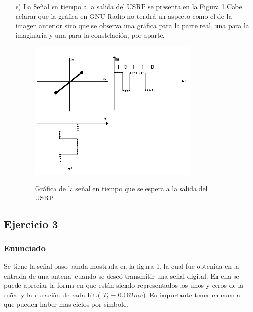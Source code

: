 \begin{itemize}
\item[e)] La Señal en tiempo a la salida del USRP se presenta en la Figura \ref{fig:senalesperadausrp}.Cabe aclarar que la gráfica en GNU Radio no tendrá un aspecto como el de la imagen anterior sino que se observa una gráfica para la parte real, una para la imaginaria y una para la constelación, por aparte. 
\vspace{300px}
 \begin{figure}[h!]
	\captionsetup{justification = raggedright, singlelinecheck = false}
    \caption{Gráfica de la señal en tiempo que se espera a la salida del USRP.}
    \centering
    \includegraphics[width=0.8\textwidth]{Imagenes/finalll.png}
    \label{fig:senalesperadausrp}
\end{figure}



\end{itemize}

\subsection{Ejercicio 3}
\subsubsection{Enunciado}

Se tiene la señal paso banda mostrada en la figura 1. la cual fue obtenida en la entrada de una antena, cuando se deseó transmitir una señal digital. En ella se puede apreciar la forma en que están siendo representados los unos y ceros de la señal y la duración de cada bit.( $T_{b}=0.062ms$). Es importante tener en cuenta que pueden haber mas ciclos por símbolo.\\\\

